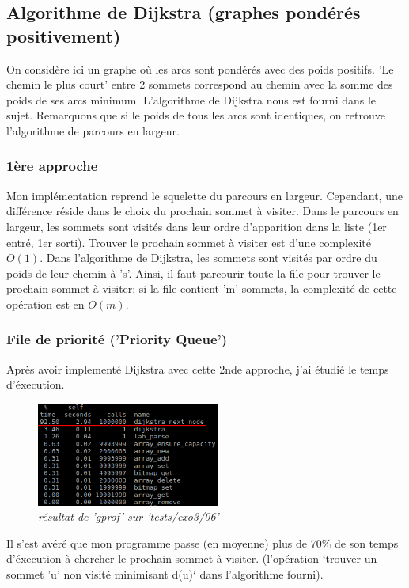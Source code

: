 \documentclass[10pt]{article}
\begin{document}
		\subsection{Algorithme de Dijkstra (graphes pondérés positivement)}
			On considère ici un graphe où les arcs sont pondérés avec des poids positifs.\newline
			'Le chemin le plus court' entre 2 sommets correspond au chemin avec la somme des poids de ses arcs minimum.\newline
			L'algorithme de Dijkstra nous est fourni dans le sujet. Remarquons que si le poids de tous les arcs sont identiques,
			on retrouve l'algorithme de parcours en largeur.
			\subsubsection{1ère approche}
				Mon implémentation reprend le squelette du parcours en largeur.
				Cependant, une différence réside dans le choix du prochain sommet à visiter. Dans le parcours en largeur,
				les sommets sont visités dans leur ordre d'apparition dans la liste (1er entré, 1er sorti).
				Trouver le prochain sommet à visiter est d'une complexité \textbf{\(O(1)\)}.
				Dans l'algorithme de Dijkstra, les sommets sont visités par ordre du poids de leur chemin à 's'.
				Ainsi, il faut parcourir toute la file pour trouver le prochain sommet à visiter:
				si la file contient 'm' sommets, la complexité de cette opération est en \(O(m)\).

			\subsubsection{File de priorité ('Priority Queue')}
			
				Après avoir implementé Dijkstra avec cette 2nde approche, j'ai étudié le temps d'éxecution.
				\begin{figure}[H]
					\begin{center}
						\includegraphics[width=6cm,height=\textheight,keepaspectratio]{./images/no_pqueue.png}
					\end{center}
				    \caption{\textit{résultat de 'gprof' sur 'tests/exo3/06'}}
				\end{figure}
				Il s'est avéré que mon programme passe (en moyenne) plus de 70\% de
				son temps d'éxecution à chercher le prochain sommet à visiter.
				(l'opération `trouver un sommet 'u' non visité minimisant d(u)` dans l'algorithme fourni).\newline
				
\end{document}
